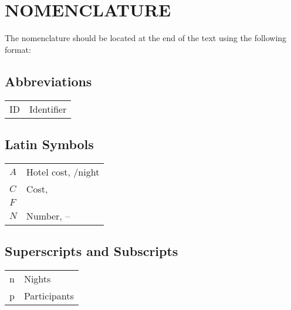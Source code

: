 \section*{NOMENCLATURE}
\label{sec:symbole_abk}

The nomenclature should be located at the end of the text using the following format:

\subsection*{Abbreviations}
\begin{tabular}{@{}p{2cm}l}
    ID & Identifier\\
\end{tabular}

\subsection*{Latin Symbols}
\begin{tabular}{@{}p{2cm}l}
	$A$ & Hotel cost, \EUR{}/night \\
    
    $C$ & Cost, \EUR{} \\
    $F$ & \\
    $N$ & Number, -- \\
\end{tabular}
 

\subsection*{Superscripts and Subscripts}
\begin{tabular}{@{}p{2cm}l}
    n & Nights \\
	p & Participants \\
\end{tabular}
